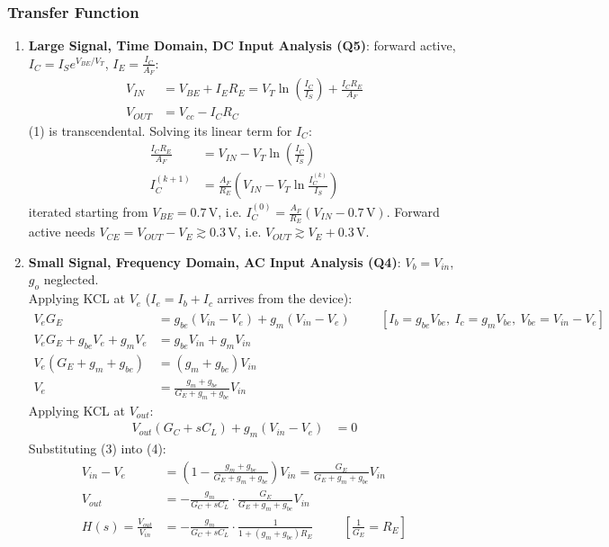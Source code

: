 \subsubsection{Transfer Function}
\begin{enumerate}
  \item \textbf{Large Signal, Time Domain, DC Input Analysis (Q5)}: forward active,
    \(I_C = I_S e^{V_{BE}/V_T}\), \(I_E = \frac{I_C}{A_F}\):
    \begin{align*}
      V_{IN} &= V_{BE} + I_E R_E = V_T \ln\left(\frac{I_C}{I_S}\right) + \frac{I_C R_E}{A_F} \tag{1} \\
      V_{OUT} &= V_{cc} - I_C R_C \tag{2}
    \end{align*}
    (1) is transcendental. Solving its linear term for \(I_C\):
    \begin{align*}
      \frac{I_C R_E}{A_F} &= V_{IN} - V_T \ln\left(\frac{I_C}{I_S}\right) \\
      I_C^{(k+1)} &= \frac{A_F}{R_E}\left(V_{IN} - V_T \ln\frac{I_C^{(k)}}{I_S}\right)
    \end{align*}
    iterated starting from \(V_{BE} = 0.7\,\)V, i.e.
    \(I_C^{(0)} = \frac{A_F}{R_E}(V_{IN} - 0.7\,\text{V})\). Forward active needs
    \(V_{CE} = V_{OUT} - V_E \gtrsim 0.3\,\)V, i.e. \(V_{OUT} \gtrsim V_E + 0.3\,\)V.
  \item \textbf{Small Signal, Frequency Domain, AC Input Analysis (Q4)}: \(V_b = V_{in}\), \(g_o\) neglected.\\
    Applying KCL at \(V_e\) (\(I_e = I_b + I_c\) arrives from the device):
    \begin{align*}
      V_e G_E &= g_{be}(V_{in} - V_e) + g_m (V_{in} - V_e) \hspace{1cm} [I_b = g_{be} V_{be},\ I_c = g_m V_{be},\ V_{be} = V_{in} - V_e] \\
      V_e G_E + g_{be} V_e + g_m V_e &= g_{be} V_{in} + g_m V_{in} \\
      V_e (G_E + g_m + g_{be}) &= (g_m + g_{be}) V_{in} \\
      V_e &= \frac{g_m + g_{be}}{G_E + g_m + g_{be}} V_{in} \tag{3}
    \end{align*}
    Applying KCL at \(V_{out}\):
    \begin{align*}
      V_{out} (G_C + sC_L) + g_m (V_{in} - V_e) &= 0 \tag{4}
    \end{align*}
    Substituting (3) into (4):
    \begin{align*}
      V_{in} - V_e &= \left(1 - \frac{g_m + g_{be}}{G_E + g_m + g_{be}}\right) V_{in} = \frac{G_E}{G_E + g_m + g_{be}} V_{in} \\
      V_{out} &= -\frac{g_m}{G_C + sC_L} \cdot \frac{G_E}{G_E + g_m + g_{be}} V_{in} \\
      H(s) = \frac{V_{out}}{V_{in}} &= -\frac{g_m}{G_C + sC_L} \cdot \frac{1}{1 + (g_m + g_{be}) R_E} \hspace{1cm} \left[\tfrac{1}{G_E} = R_E\right] \tag{5}
    \end{align*}
\end{enumerate}

